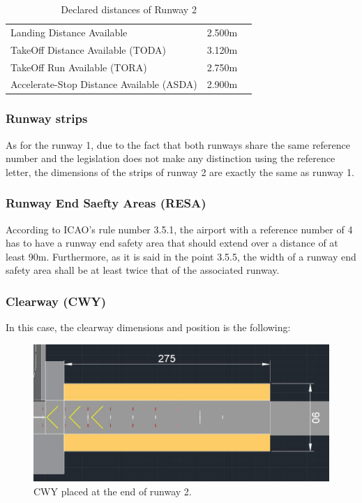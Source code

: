 	\begin{table}[htb]
		\centering
		\begin{tabular}{ll p{5cm}}
			\midrule[2pt]
			Landing Distance Available & 2.500m\\
			TakeOff Distance Available (TODA) & 3.120m\\
			TakeOff Run Available (TORA)& 2.750m\\
			Accelerate-Stop Distance Available (ASDA)& 2.900m\\
			\bottomrule[2pt]
		\end{tabular}
		\caption{Declared distances of  Runway 2}
		\label{DeclareddistancesRW2}
	\end{table}
	
	
	\subsubsection{Runway strips}
	As for the runway 1, due to the fact that both runways share the same reference number and the legislation does not make any distinction using the reference letter, the dimensions of the strips of runway 2 are exactly the same as runway 1. 
	
	\subsubsection{Runway End Saefty Areas (RESA)}
	According to ICAO's rule number 3.5.1, the airport with a reference number of 4 has to have a runway end safety area that should extend over a distance of at least 90m. Furthermore, as it is said in the point 3.5.5, the width of a runway end safety area shall be at least twice that of the associated runway. 
	
	\subsubsection{Clearway (CWY)}
	In this case, the clearway dimensions and position is the following:
	
	\begin{figure}[H]
		\centering
		\includegraphics[clip, trim=0cm 0cm 0cm 0cm, width=1\textwidth]{./images/declareddistances/CWY2}
		\caption{CWY placed at the end of runway 2.} %
		\label{} %
	\end{figure}
		
		
		